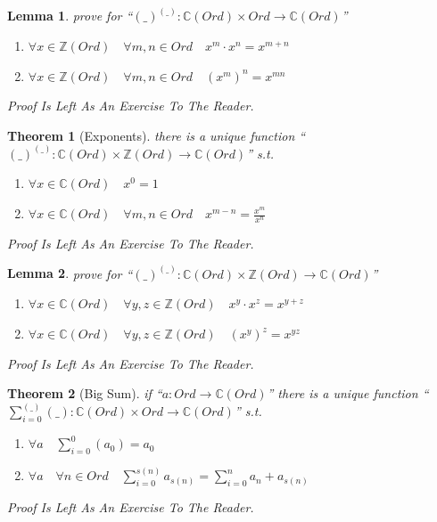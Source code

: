 \documentclass[10pt,a4paper]{book}
\newtheorem{theorem}{Theorem}[section]
\newtheorem{lemma}{Lemma}[section]
\begin{document}
\begin{lemma}prove for ``$(\_)^{(\_)} :\mathbb{C} (Ord) \times Ord \to \mathbb{C} (Ord)$''
    \begin{enumerate}
        \setlength{\itemsep}{0pt} %
        \item       $\forall x   \in \mathbb{Z} (Ord) \quad \forall m ,n  \in Ord \quad  x^m  \cdot  x^n = x^{m  + n}  $
        \item       $\forall x   \in \mathbb{Z} (Ord) \quad \forall m ,n  \in Ord \quad (x^m)^n = x^{m n}  $
    \end{enumerate}
    Proof Is Left As An Exercise To The Reader.
\end{lemma}

\begin{theorem}[Exponents] there is a unique function ``$(\_)^{(\_)} :\mathbb{C} (Ord) \times \mathbb{Z} (Ord) \to \mathbb{C} (Ord)$'' s.t.

    \begin{enumerate}
        \setlength{\itemsep}{0pt} %
        \item       $\forall x \in \mathbb{C} (Ord) \quad x ^ 0 = 1$
        \item       $\forall x \in \mathbb{C} (Ord) \quad \forall m ,n  \in Ord \quad  x ^ {m-n} = \frac{x ^ m}{x^n}    $
    \end{enumerate}
    Proof Is Left As An Exercise To The Reader.
\end{theorem}

\begin{lemma}prove for ``$(\_)^{(\_)} :\mathbb{C} (Ord) \times \mathbb{Z} (Ord) \to \mathbb{C} (Ord)$''
    \begin{enumerate}
        \setlength{\itemsep}{0pt} %
        \item       $\forall x   \in \mathbb{C} (Ord) \quad \forall y ,z  \in \mathbb{Z} (Ord) \quad  x^y  \cdot  x^z = x^{y  + z}  $
        \item       $\forall x   \in \mathbb{C} (Ord) \quad \forall y ,z  \in \mathbb{Z} (Ord) \quad (x^y)^z = x^{y z}  $
    \end{enumerate}
    Proof Is Left As An Exercise To The Reader.
\end{lemma}

\begin{theorem}[Big Sum] if ``$a : Ord \to \mathbb{C} (Ord)$'' there is a unique function ``$\sum_{i = 0}^{(\_)} (\_)  :\mathbb{C} (Ord) \times Ord \to \mathbb{C} (Ord)$'' s.t.

    \begin{enumerate}
        \setlength{\itemsep}{0pt} %
        \item       $\forall a \quad  \sum_{i = 0}^{0} (a_0)  = a_0$
        \item       $\forall a \quad \forall n \in Ord \quad  \sum_{i = 0}^{s(n)} a_{s(n)} = \sum_{i = 0}^{n} a_n + a_{s(n)}  $
    \end{enumerate}
    Proof Is Left As An Exercise To The Reader.
\end{theorem}
\end{document}
